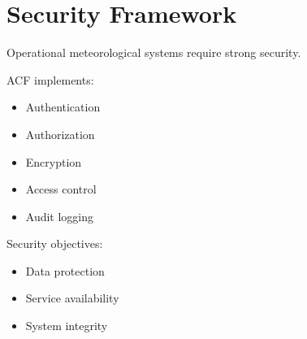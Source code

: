 \section{Security Framework}


Operational meteorological systems require strong security.



ACF implements:


\begin{itemize}

\item Authentication

\item Authorization

\item Encryption

\item Access control

\item Audit logging

\end{itemize}



Security objectives:


\begin{itemize}

\item Data protection

\item Service availability

\item System integrity

\end{itemize}
